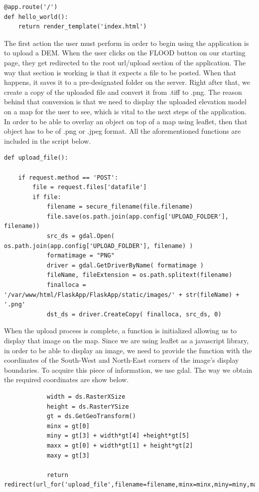 \begin{lstlisting}
@app.route('/')
def hello_world():
	return render_template('index.html')
\end{lstlisting}

The first action the user must perform in order to begin using the application is to upload a DEM. When the user clicks on the FLOOD button on our starting page, they get redirected to the root url/upload  section of the application. The way that section is working is that it expects a file to be posted. When that happens, it saves it to a pre-designated folder on the server. Right after that, we create a copy of the uploaded file and convert it from .tiff to .png. The reason behind that conversion is that we need to display the uploaded elevation model on a map for the user to see, which is vital to the next steps of the application. In order to be able to overlay an object on top of a map using leaflet, then that object has to be of .png or .jpeg format. All the aforementioned functions are included in the script below.\\

\begin{lstlisting}
def upload_file():

	if request.method == 'POST':
		file = request.files['datafile']
		if file:
			filename = secure_filename(file.filename)
			file.save(os.path.join(app.config['UPLOAD_FOLDER'], filename))
			src_ds = gdal.Open( os.path.join(app.config['UPLOAD_FOLDER'], filename) )
			formatimage = "PNG"
			driver = gdal.GetDriverByName( formatimage )
			fileName, fileExtension = os.path.splitext(filename)
			finalloca = '/var/www/html/FlaskApp/FlaskApp/static/images/' + str(fileName) + '.png'
			dst_ds = driver.CreateCopy( finalloca, src_ds, 0)
\end{lstlisting}

When the upload process is complete, a function is initialized allowing us to display that image on the map. Since we are using leaflet as a javascript library, in order to be able to display an image, we need to provide the function with the coordinates of the South-West and North-East corners of the image's display boundaries. To acquire this piece of information, we use gdal. The way we obtain the required coordinates are show below.\\

\begin{lstlisting}
			width = ds.RasterXSize
			height = ds.RasterYSize
			gt = ds.GetGeoTransform()
			minx = gt[0]
			miny = gt[3] + width*gt[4] +height*gt[5]
			maxx = gt[0] + width*gt[1] + height*gt[2]
			maxy = gt[3]

			return redirect(url_for('upload_file',filename=filename,minx=minx,miny=miny,maxx=maxx,maxy=maxy))
\end{lstlisting}\\

